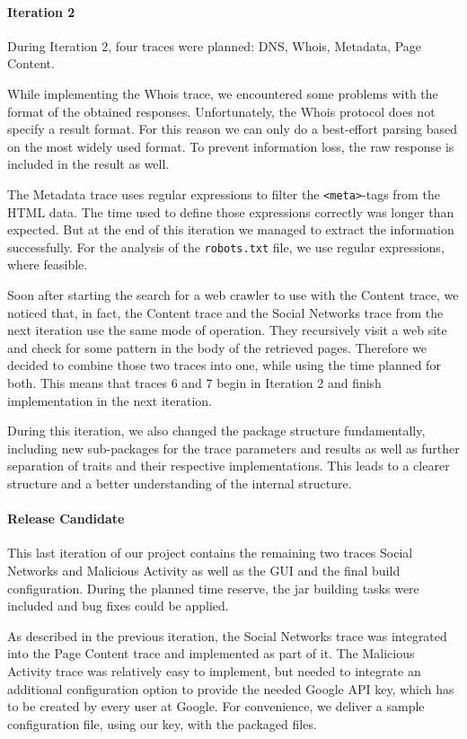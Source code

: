 \documentclass[
	a4paper,					10pt,							twoside,					openright,				notitlepage,			parskip=half,			]{scrreprt}
\begin{document}
\paragraph{Iteration 2}
During Iteration 2, four traces were planned: \gls{DNS}, Whois, Metadata, Page Content.

While implementing the Whois trace, we encountered some problems with the format
of the obtained responses. Unfortunately, the Whois protocol does not specify a
result format. For this reason we can only do a best-effort parsing based on the 
most widely used format. To prevent information loss, the raw response is included
in the result as well. 

The Metadata trace uses regular expressions to filter the \verb|<meta>|-tags from the
\gls{HTML} data. The time used to define those expressions correctly was longer than expected. 
But at the end of this iteration we managed to extract the information successfully. For
the analysis of the \verb|robots.txt| file, we use regular expressions, where feasible.

Soon after starting the search for a web crawler to use with the Content trace, we 
noticed that, in fact, the Content trace and the Social Networks trace from the next 
iteration use the same mode of operation. They recursively visit a web site and 
check for some pattern in the body of the retrieved pages. Therefore we decided to 
combine those two traces into one, while using the time planned for both. This means that
traces 6 and 7 begin in Iteration 2 and finish implementation in the next iteration.

During this iteration, we also changed the package structure fundamentally, including new
sub-packages for the trace parameters and results as well as further separation of traits and their
respective implementations. This leads to a clearer structure and a better understanding of
the internal structure.

\paragraph{Release Candidate}
This last iteration of our project contains the remaining two traces Social Networks and Malicious Activity
as well as the \gls{GUI} and the final build configuration. During the planned time reserve, the jar building tasks
were included and bug fixes could be applied.

As described in the previous iteration, the Social Networks trace was integrated into the Page Content trace
and implemented as part of it. The Malicious Activity trace was relatively easy to implement, but needed to 
integrate an additional configuration option to provide the needed Google \gls{API} key, which has to be created by
every user at Google. For convenience, we deliver a sample configuration file, using our key, with the packaged files.
\end{document}
